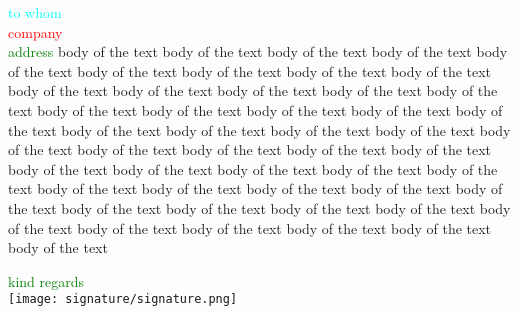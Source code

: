 \documentclass[11pt,letterpaper,foldmarks=on]{letter}
\begin{document}
\begin{letter}{
	\textcolor{cyan}{to whom} \\ \medskip \textcolor{red}{company} \\ \textcolor{green}{address}
}
{\quad body of the text body of the text body of the text body of the text body of the text body of the text body of the text body of the text body of the text body of the text body of the text body of the text body of the text body of the text body of the text body of the text body of the text body of the text body of the text body of the text body of the text body of the text body of the text body of the text body of the text body of the text body of the text body of the text body of the text body of the text body of the text body of the text body of the text body of the text body of the text body of the text body of the text body of the text body of the text body of the text body of the text body of the text body of the text body of the text body of the text body of the text body of the text body of the text
}





\closing{
	\vspace{\baselineskip}
	\textcolor{green}{kind regards}
	\vspace{\baselineskip}
	\\ \texttt{[image: signature/signature.png]}
}

\vspace{3\baselineskip}

\encl{
	\begin{itemize}
		\item \textcolor{cyan}{attachment no. 1}
	\end{itemize}
}


\end{letter}
\end{document}
